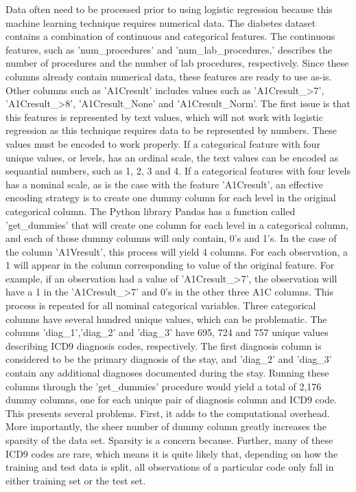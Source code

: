 \documentclass[sigconf]{acmart}
\begin{document}
Data often need to be processed prior to using logistic regression because this machine learning technique requires numerical data. The diabetes dataset contains a combination of continuous and categorical features. The continuous features, such as 'num\_procedures' and 'num\_lab\_procedures,' describes the number of procedures and the number of lab procedures, respectively. Since these columns already contain numerical data, these features are ready to use as-is. Other columns such as 'A1Cresult' includes values such as 'A1Cresult\_>7', 'A1Cresult\_>8', 'A1Cresult\_None' and 'A1Cresult\_Norm'. The first issue is that this features is represented by text values, which will not work with logistic regression as this technique requires data to be represented by numbers. These values must be encoded to work properly. If a categorical feature with four unique values, or levels, has an ordinal scale, the text values can be encoded as sequantial numbers, such as 1, 2, 3 and 4. If a categorical features with four levels has a nominal scale, as is the case with the feature 'A1Cresult', an effective encoding strategy is to create one dummy column for each level in the original categorical column.
The Python library Pandas has a function called 'get\_dummies' that will create one column for each level in a categorical column, and each of those dummy columns will only contain, 0's and 1's. In the case of the column 'A1Vresult', this process will yield 4 columns. For each observation, a 1 will appear in the column corresponding to value of the original feature. For example, if an observation had a value of 'A1Cresult\_>7', the observation will have a 1 in the 'A1Cresult\_>7' and 0's in the other three A1C columns. This process is repeated for all nominal categorical variables.
Three categorical columns have several hundred unique values, which can be problematic. The columns 'diag\_1','diag\_2' and 'diag\_3' have 695, 724 and 757 unique values describing ICD9 diagnosis codes, respectively. The first diagnosis column is considered to be the primary diagnosis of the stay, and 'diag\_2' and 'diag\_3' contain any additional diagnoses documented during the stay. Running these columns through the 'get\_dummies' procedure would yield a total of 2,176 dummy columns, one for each unique pair of diagnosis column and ICD9 code. This presents several problems. First, it adds to the computational overhead. More importantly, the sheer number of dummy column greatly increases the sparsity of the data set. Sparsity is a concern because. Further, many of these ICD9 codes are rare, which means it is quite likely that, depending on how the training and test data is split, all observations of a particular code only fall in either training set or the test set.
\end{document}
